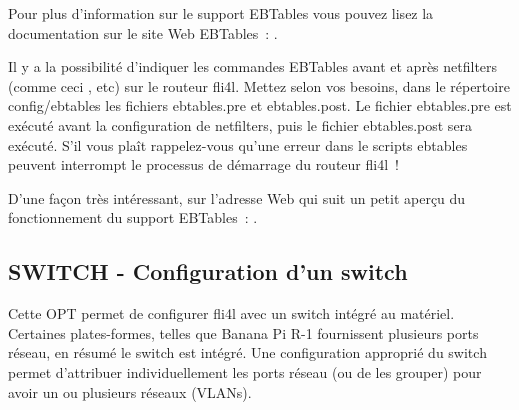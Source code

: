 Pour plus d'information sur le support EBTables vous pouvez lisez la
documentation sur le site Web EBTables~:
.

Il y a la possibilité d'indiquer les commandes EBTables avant et après
netfilters (comme ceci ,  etc) sur le routeur fli4l.
Mettez selon vos besoins, dans le répertoire config/ebtables les fichiers
ebtables.pre et ebtables.post. Le fichier ebtables.pre est exécuté avant
la configuration de netfilters, puis le fichier ebtables.post sera exécuté.
S'il vous plaît rappelez-vous qu'une erreur dans le scripts ebtables
peuvent interrompt le processus de démarrage du routeur fli4l~!


D'une façon très intéressant, sur l'adresse Web qui suit un petit aperçu du
fonctionnement du support EBTables~:
.

{
\subsection {SWITCH - Configuration d'un switch}
}

Cette OPT permet de configurer fli4l avec un switch intégré au matériel.
Certaines plates-formes, telles que Banana Pi R-1 fournissent plusieurs ports
réseau, en résumé le switch est intégré. Une configuration approprié du switch
permet d'attribuer individuellement les ports réseau (ou de les grouper) pour
avoir un ou plusieurs réseaux (VLANs).

